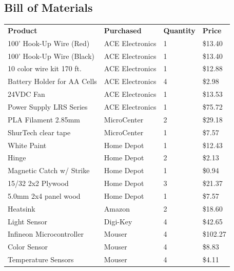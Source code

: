 \documentclass[12pt,a4paper]{report}
\begin{document}
\subsection{Bill of Materials}

\begin{table}[H]

\begin{center}
\begin{tabular}{llll}
\textbf{Product}              & \textbf{Purchased} & \textbf{Quantity} & \textbf{Price}    \\
100' Hook-Up Wire (Red)       & ACE Electronics & 1        & \$13.40  \\
100' Hook-Up Wire (Black)     & ACE Electronics & 1        & \$13.40  \\
10 color wire kit 170 ft.     & ACE Electronics & 1        & \$12.88  \\
Battery Holder for AA Cells   & ACE Electronics & 4        & \$2.98   \\
24VDC Fan                     & ACE Electronics & 1        & \$13.53  \\
Power Supply LRS Series       & ACE Electronics & 1        & \$75.72  \\
PLA Filament 2.85mm           & MicroCenter     & 2        & \$29.18  \\
ShurTech clear tape           & MicroCenter     & 1        & \$7.57   \\
White Paint                   & Home Depot      & 1        & \$12.43  \\
Hinge                         & Home Depot      & 2        & \$2.13   \\
Magnetic Catch w/ Strike      & Home Depot      & 1        & \$0.94   \\
15/32 2x2 Plywood             & Home Depot      & 3        & \$21.37  \\
5.0mm 2x4 panel wood          & Home Depot      & 1        & \$7.57   \\
Heatsink                      & Amazon          & 2        & \$18.60  \\
Light Sensor                  & Digi-Key        & 4        & \$42.65  \\
Infineon Microcontroller      & Mouser          & 4        & \$102.27 \\
Color Sensor                  & Mouser          & 4        & \$8.83   \\
Temperature Sensors           & Mouser          & 4        & \$4.11   \\

\end{tabular}
\end{center}
\end{table}
\end{document}
